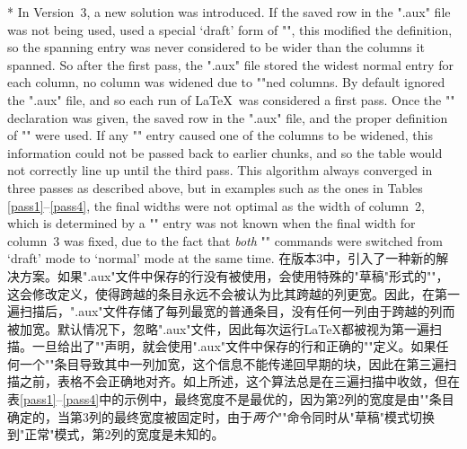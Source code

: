 \begin{paracol}{2}
\switchcolumn[0]*
In Version~3, a new solution was introduced. If the saved row in
the ".aux" file was not being used,  used a special
`draft' form of "\multicolumn", this modified the definition, so the
spanning entry was never considered to be wider than the columns it
spanned. So after the first pass, the ".aux" file stored the
widest normal entry for each column, no column was widened due to
"\span"ned columns. By default  ignored the ".aux"
file, and so each run of \LaTeX\ was considered a first pass. Once the
"\setlongtables" declaration was given, the saved row in the ".aux"
file, and the proper definition of "\multicolumn" were used. If any
"\multicolumn" entry caused one of the columns to be widened, this
information could not be passed back to earlier chunks, and so the
table would not correctly line up until the third pass. This algorithm
always converged in three passes as described above, but in examples
such as the ones in Tables \ref{pass1}--\ref{pass4}, the final
widths were not optimal as the width of column~2, which is
determined by a "\multicolumn" entry was not known when the final
width for column~3 was fixed, due to the fact that \emph{both}
"\multicolumn" commands were switched from `draft' mode to `normal'
mode at the same time.
\switchcolumn 在版本3中，引入了一种新的解决方案。如果".aux"文件中保存的行没有被使用，会使用特殊的"草稿"形式的"\multicolumn"，这会修改定义，使得跨越的条目永远不会被认为比其跨越的列更宽。因此，在第一遍扫描后，".aux"文件存储了每列最宽的普通条目，没有任何一列由于跨越的列而被加宽。默认情况下，忽略".aux"文件，因此每次运行\LaTeX 都被视为第一遍扫描。一旦给出了"\setlongtables"声明，就会使用".aux"文件中保存的行和正确的"\multicolumn"定义。如果任何一个"\multicolumn"条目导致其中一列加宽，这个信息不能传递回早期的块，因此在第三遍扫描之前，表格不会正确地对齐。如上所述，这个算法总是在三遍扫描中收敛，但在表\ref{pass1}--\ref{pass4}中的示例中，最终宽度不是最优的，因为第2列的宽度是由"\multicolumn"条目确定的，当第3列的最终宽度被固定时，由于\emph{两个}"\multicolumn"命令同时从"草稿"模式切换到"正常"模式，第2列的宽度是未知的。


\end{paracol}
